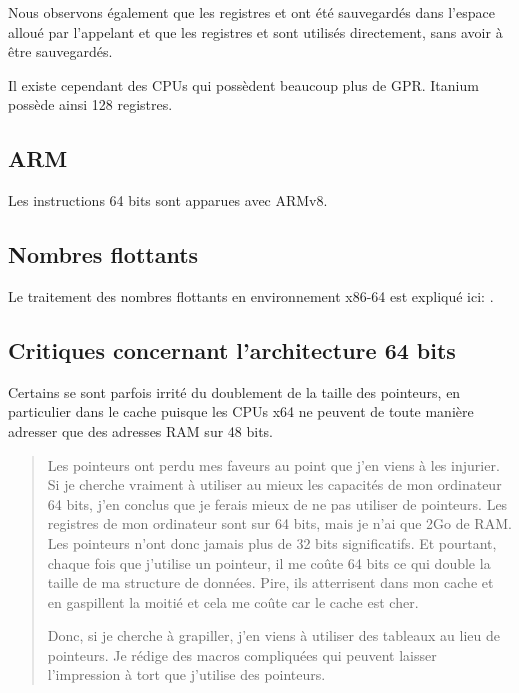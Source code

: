 Nous observons également que les registres \RCX et \RDX ont été sauvegardés dans l'espace alloué 
par l'\gls{appelant} et que les registres  et  sont utilisés directement, sans avoir 
à être sauvegardés.
\fi

Il existe cependant des CPUs qui possèdent beaucoup plus de \ac{GPR}. Itanium possède ainsi 128 
registres.

\subsection{ARM}

Les instructions 64 bits sont apparues avec ARMv8.

\subsection{Nombres flottants}

Le traitement des nombres flottants en environnement x86-64 est expliqué ici: .

\subsection{Critiques concernant l'architecture 64 bits}

Certains se sont parfois irrité du doublement de la taille des pointeurs, en particulier dans le 
cache puisque les \ac{CPU}s x64 ne peuvent de toute manière adresser que des adresses \ac{RAM} 
sur 48 bits.

\begin{framed}
\begin{quotation}
Les pointeurs ont perdu mes faveurs au point que j'en viens à les injurier. Si je cherche vraiment 
à utiliser au mieux les capacités de mon ordinateur 64 bits, j'en conclus que je ferais mieux de 
ne pas utiliser de pointeurs. Les registres de mon ordinateur sont sur 64 bits, mais je n'ai que 
2Go de RAM. Les pointeurs n'ont donc jamais plus de 32 bits significatifs. Et pourtant, chaque 
fois que j'utilise un pointeur, il me coûte 64 bits ce qui double la taille de ma structure de 
données. Pire, ils atterrisent dans mon cache et en gaspillent la moitié et cela me coûte car le
cache est cher.

Donc, si je cherche à grapiller, j'en viens à utiliser des tableaux au lieu de pointeurs. Je 
rédige des macros compliquées qui peuvent laisser l'impression à tort que j'utilise des pointeurs.
\end{quotation}
\end{framed}

